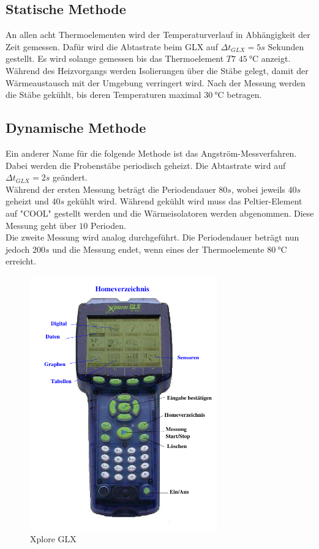 \subsection{Statische Methode}
\label{subsec:durch_stat}
An allen acht Thermoelementen wird der Temperaturverlauf in Abhängigkeit der Zeit gemessen.
Dafür wird die Abtastrate beim GLX auf $\Delta t_{GLX} = 5\si{s}$ Sekunden gestellt.
Es wird solange gemessen bis das Thermoelement $T7$ $\qty{45}{\degreeCelsius}$ anzeigt.
Während des Heizvorgangs werden Isolierungen über die Stäbe gelegt, damit der Wärmeaustausch mit der Umgebung verringert wird.
Nach der Messung werden die Stäbe gekühlt, bis deren Temperaturen maximal $\qty{30}{\degreeCelsius}$ betragen.

\subsection{Dynamische Methode}
\label{subsec:durch_dyn}
Ein anderer Name für die folgende Methode ist das Angström-Messverfahren.
Dabei werden die Probenstäbe periodisch geheizt.
Die Abtastrate wird auf $\Delta t_{GLX} = 2\si{s}$ geändert.\\
Während der ersten Messung beträgt die Periodendauer $80\si{s}$, wobei jeweils $40\si{s}$ geheizt und $40\si{s}$ gekühlt wird.
Während gekühlt wird muss das Peltier-Element auf "COOL" gestellt werden und die Wärmeisolatoren werden abgenommen.
Diese Messung geht über $10$ Perioden.\\
Die zweite Messung wird analog durchgeführt. 
Die Periodendauer beträgt nun jedoch $200 \si{s}$ und die Messung endet, wenn eines der Thermoelemente $\qty{80}{\degreeCelsius}$ erreicht.

\begin{figure}[H]
    \centering
    \includegraphics[height=11cm]{content/Abb_2.pdf}
    \caption{Xplore GLX\cite[5]{V204}}
    \label{fig:GLX}
\end{figure}

